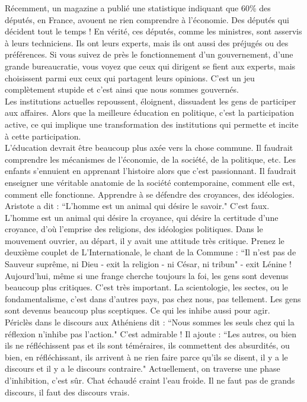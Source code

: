 Récemment, un magazine a publié une statistique indiquant que 60\% des députés, en France, avouent ne rien comprendre à l’économie. Des députés qui décident tout le temps ! En vérité, ces députés, comme les ministres, sont asservis à leurs techniciens. Ils ont leurs experts, mais ils ont aussi des préjugés ou des préférences. Si vous suivez de près le fonctionnement d’un gouvernement, d’une grande bureaucratie, vous voyez que ceux qui dirigent se fient aux experts, mais choisissent parmi eux ceux qui partagent leurs opinions. C’est un jeu complètement stupide et c’est ainsi que nous sommes gouvernés.\\
Les institutions actuelles repoussent, éloignent, dissuadent les gens de participer aux affaires. Alors que la meilleure éducation en politique, c’est la participation active, ce qui implique une transformation des institutions qui permette et incite à cette participation.\\
L’éducation devrait être beaucoup plus axée vers la chose commune. Il faudrait comprendre les mécanismes de l’économie, de la société, de la politique, etc. Les enfants s’ennuient en apprenant l’histoire alors que c’est passionnant. Il faudrait enseigner une véritable anatomie de la société contemporaine, comment elle est, comment elle fonctionne. Apprendre à se défendre des croyances, des idéologies.\\
Aristote a dit : ``L’homme est un animal qui désire le savoir." C’est faux. L’homme est un animal qui désire la croyance, qui désire la certitude d’une croyance, d’où l’emprise des religions, des idéologies politiques. Dans le mouvement ouvrier, au départ, il y avait une attitude très critique. Prenez le deuxième couplet de L’Internationale, le chant de la Commune : ``Il n’est pas de Sauveur suprême, ni Dieu - exit la religion - ni César, ni tribun" - exit Lénine !\\
Aujourd’hui, même si une frange cherche toujours la foi, les gens sont devenus beaucoup plus critiques. C’est très important. La scientologie, les sectes, ou le fondamentalisme, c’est dans d’autres pays, pas chez nous, pas tellement. Les gens sont devenus beaucoup plus sceptiques. Ce qui les inhibe aussi pour agir.\\
Périclès dans le discours aux Athéniens dit : ``Nous sommes les seuls chez qui la réflexion n’inhibe pas l’action." C’est admirable ! Il ajoute : ``Les autres, ou bien ils ne réfléchissent pas et ils sont téméraires, ils commettent des absurdités, ou bien, en réfléchissant, ils arrivent à ne rien faire parce qu’ils se disent, il y a le discours et il y a le discours contraire." Actuellement, on traverse une phase d’inhibition, c’est sûr. Chat échaudé craint l’eau froide. Il ne faut pas de grands discours, il faut des discours vrais.\\
